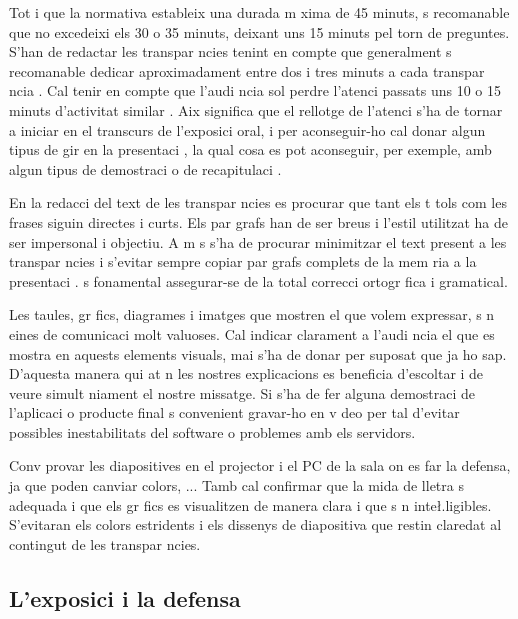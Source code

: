         Tot i que la normativa estableix una durada m xima de 45 minuts,  s recomanable que no excedeixi els 30 o 35 minuts, deixant uns 15 minuts pel torn de preguntes. S'han de redactar les transpar ncies tenint en compte que generalment  s recomanable dedicar aproximadament entre dos i tres minuts a cada transpar ncia \cite{Padgett08}. Cal tenir en compte que l'audi ncia sol perdre l'atenci  passats uns 10 o 15 minuts d'activitat similar \cite{Padgett08}. Aix  significa que el rellotge de l'atenci  s'ha de tornar a iniciar en el transcurs de l'exposici  oral, i per aconseguir-ho cal donar algun tipus de gir en la presentaci , la qual cosa es pot aconseguir, per exemple, amb algun tipus de demostraci  o de recapitulaci .

        En la redacci  del text de les transpar ncies es procurar  que tant els t tols com les frases siguin directes i curts. Els par grafs han de ser breus i l'estil utilitzat ha de ser impersonal i objectiu. A m s s'ha de procurar minimitzar el text present a les transpar ncies i s'evitar  sempre copiar par grafs complets de la mem ria a la presentaci .  s fonamental assegurar-se de la total correcci  ortogr fica i gramatical.

        Les taules, gr fics, diagrames i imatges que mostren el que volem expressar, s n eines de comunicaci  molt valuoses. Cal indicar clarament a l'audi ncia el que es mostra en aquests elements visuals, mai s'ha de donar per suposat que ja ho sap. D'aquesta manera qui at n les nostres explicacions es beneficia d'escoltar i de veure simult niament el nostre missatge. Si s'ha de fer alguna demostraci  de l'aplicaci  o producte final  s convenient gravar-ho en v deo per tal d'evitar possibles inestabilitats del software o problemes amb els servidors.

        Conv  provar les diapositives en el projector i el PC de la sala on es far  la defensa, ja que poden canviar colors, ... Tamb  cal confirmar que la mida de lletra  s adequada i que els gr fics es visualitzen de manera clara i que s n inte\l.ligibles. S'evitaran els colors estridents i els dissenys de diapositiva que restin claredat al contingut de les transpar ncies.

\subsection{L'exposici  i la defensa}

